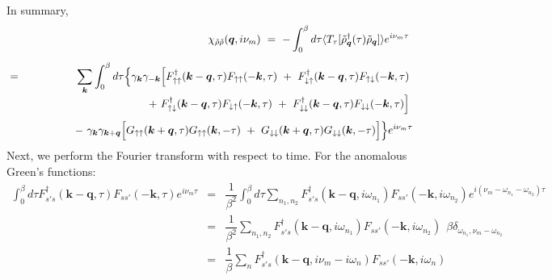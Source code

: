 \documentclass[a4j]{jsarticle}
\begin{document}
In summary,
%
%
%
%
\begin{eqnarray}
	&&
	\chi_{\tilde{\rho} \tilde{\rho}}(\bm{q},i \nu_{m})
	\ = \
	-
	\int^{\beta}_{0} d \tau
	\langle T_{\tau}[ \tilde{\rho}_{\bm{q}}^{\dagger} (\tau) \tilde{\rho}_{\bm{q}} ] \rangle
	e^{i \nu_{m} \tau}
	\nonumber \ \\[2mm]
	&=&
	\sum_{ \bm{k} }
	\int^{\beta}_{0} d \tau
	\Big\{
	\gamma_{\bm{k}}
	\gamma_{-\bm{k}}
	\Big[
		F_{ \uparrow \uparrow }^{\dagger}( \bm{k} - \bm{q} , \tau )
		F_{ \uparrow \uparrow } ( - \bm{k} , \tau )
		\ + \
		F_{ \downarrow \uparrow }^{\dagger}( \bm{k} - \bm{q} , \tau )
		F_{ \uparrow \downarrow } ( - \bm{k} , \tau )
		\nonumber \ \\[-1mm] && \hspace{29mm} + \
	F_{ \uparrow \downarrow }^{\dagger}( \bm{k} - \bm{q} , \tau )
	F_{ \downarrow \uparrow } ( - \bm{k} , \tau )
	\ + \
	F_{ \downarrow \downarrow }^{\dagger}( \bm{k} - \bm{q} , \tau )
	F_{ \downarrow \downarrow } ( - \bm{k} , \tau )
	\Big]
	\nonumber \ \\[1mm] && \hspace{15mm} - \
	\gamma_{\bm{k}}
	\gamma_{\bm{k}+\bm{q}}
	\Big[
		G_{\uparrow \uparrow}( \bm{k}+\bm{q} , \tau)
		G_{\uparrow \uparrow}( \bm{k} , - \tau)
		\ + \
		G_{\downarrow \downarrow}( \bm{k}+\bm{q} , \tau)
		G_{\downarrow \downarrow}( \bm{k} , - \tau)
		\Big]
	\Big\}
	e^{i \nu_{m} \tau}
\end{eqnarray}
%
%
%
%
Next, we perform the Fourier transform with respect to time.
For the anomalous Green's functions:
%
%
%
%
\begin{eqnarray}
	\int^{\beta}_{0} d \tau
	F_{ s' s }^{\dagger}( \bm{k} - \bm{q} , \tau )
	F_{ s s' } ( - \bm{k} , \tau )
	e^{i \nu_{m} \tau}
	&=&
	\dfrac{1}{\beta^{2}}
	\int^{\beta}_{0} d \tau
	\sum_{n_{1},n_{2}}
	F_{ s' s }^{\dagger}( \bm{k} - \bm{q} , i \omega_{n_{1}} )
	F_{ s s' } ( - \bm{k} , i \omega_{n_{2}} )
	e^{i ( \nu_{m} - \omega_{n_{1}} - \omega_{n_{2}} ) \tau }
	\nonumber \\[2mm] &=&
	\dfrac{ 1 }{\beta^{2}} \sum_{n_{1},n_{2}}
	F_{ s' s }^{\dagger}( \bm{k} - \bm{q} , i \omega_{n_{1}} )
	F_{ s s' } ( - \bm{k} , i \omega_{n_{2}} )
	\ \ \beta
	\delta_{ \omega_{n_{1}} , \nu_{m} - \omega_{n_{2}} }
	\nonumber \\[2mm] &=&
	\dfrac{ 1 }{\beta} \sum_{n}
	F_{ s' s }^{\dagger}( \bm{k} - \bm{q} , i \nu_{m} - i \omega_{n} )
	F_{ s s' } ( - \bm{k} , i \omega_{n} )
\end{eqnarray}
\end{document}
